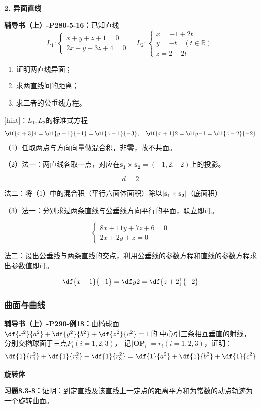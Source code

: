 {\bf 2. 异面直线}

{\bf 辅导书（上）-P280-5-16：}已知直线
$$L_1:\left\{\begin{array}{l}
	x+y+z+1=0\\
	2x-y+3z+4=0
\end{array}\right.
\quad
L_2:\left\{\begin{array}{l}
	x=-1+2t\\
	y=-t\quad(t\in\mathbb{R})\\
	z=2-2t
\end{array}\right.
$$
\begin{enumerate}[(1)]
  \setlength{\itemindent}{1cm}
  \item 证明两直线异面；
  \item 求两直线间的距离；
  \item 求二者的公垂线方程。
\end{enumerate}

[hint]：$L_1,L_2$的标准式方程
$$\df{x+3}4=\df{y-1}{-1}=\df{z-1}{-3},\quad
\df{x+1}2=\df y{-1}=\df{z-2}{-2}$$
（1）任取两点与方向向量做混合积，非零，故不共面。

（2）法一：两直线各取一点，对应在$\bm{s_1}\times\bm{s_2}=(-1,2,-2)$上的投影。

$$d=2$$

法二：将（1）中的混合积（平行六面体面积）除以$|\bm{s_1}\times\bm{s_2}|$（底面积）

（3）法一：分别求过两条直线与公垂线方向平行的平面，联立即可。

$$\left\{\begin{array}{l}
	8x+11y+7z+6=0\\
	2x+2y+z=0
\end{array}\right.$$

法二：设出公垂线与两条直线的交点，利用公垂线的参数方程和直线的参数方程求出参数值即可。

$$\df{x-1}{-1}=\df y2=\df{z+2}{-2}$$

\subsubsection{曲面与曲线}

{\bf 辅导书（上）-P290-例18：}由椭球面$\df{x^2}{a^2}+\df{y^2}{b^2}+\df{z^2}{c^2}=1$的
中心引三条相互垂直的射线，分别交椭球面于三点$P_i(i=1,2,3)$，
记$|\bm{OP}_i|=r_i(i=1,2,3)$，证明：
$$\df{1}{r_1^2}+\df{1}{r_2^2}+\df{1}{r_3^2}
=\df{1}{a^2}+\df{1}{b^2}+\df{1}{c^2}$$

{\bf 旋转体}

{\bf 习题8.3-8：}证明：到定直线及该直线上一定点的距离平方和为常数的动点轨迹为一个旋转曲面。

